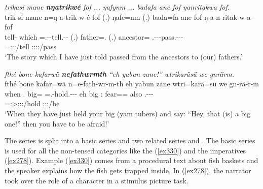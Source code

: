 \begin{exe}
	\ex \emph{trikasi mane \textbf{nŋatrikwé} fof ... ŋafynm ... badafa ane fof ŋanritakwa fof.}\\
	\glll trik-si mane n=ŋ-a-trik-w-é fof (.) ŋafe=nm (.) bada=fa ane fof ŋ-a-n-ritak-w-a-\Zero{} fof\\
	tell-\Nmlz{} which \Immpst=\M.\Alph-\Vc-tell.\Ext-\Ndu-\Fsg{} \Emph{} (.) father=\Dat.\Nsg{} (.) ancestor=\Abl{} \Dem{} \Emph{} \M.\Alph-\Vc-\Venit-pass.\Ext-\Ndu-\Pst-\Sg{} \Emph{}\\
	{} {} \footnotesize{\Immpst=\Fsg:\Sbj:\Nonpast:\Ipfv/tell} {} {} {} {} {} {} {} \footnotesize{\Stsg:\Sbj:\Pst:\Ipfv:\Venit/pass} {}\\
	\trans `The story which I have just told passed from the ancestors to (our) fathers.'\\
	\label{ex273}
\end{exe}
\begin{exe}
	\ex \emph{fthé bone kafarwä \textbf{nefathwrmth} ``eh yabun zane!'' wtrikaräsü we gnrärm.}\\
	\glll fthé bone kafar=wä n=e-fath-wr-m-th eh yabun zane wtri=karä=sü we gn-rä-r-m\\
	when \Ssg.\Poss{} big=\Emph{} \Immpst=\Stnsg.\Alph-hold.\Ext-\Ndu-\Dur-\Stnsg{} eh big \Dem:\Prox{} fear=\Prop=\Etc{} also \Ssg.\Bet-\Cop-\Ndu-\Dur{}\\
	{} {} {} \footnotesize{\Immpst=\Stpl:\Sbj>\Stpl:\Obj:\Nonpast:\Dur/hold} {} {} {} {} {} \footnotesize{\Ssg:\Sbj:\Futimp:\Ipfv/be}\\
	\trans `When they have just held your big (yam tubers) and say: ``Hey, that (is) a big one!'' then you have to be afraid!'
	\label{ex274}
\end{exe}

The \Bet{} series is split into a basic series \Bet{} and two related series \Betaone{} and \Betatwo. The basic \Bet{} series is used for all the non-tensed categories like the  (\ref{ex330}) and the imperatives (\ref{ex278}). Example (\ref{ex330}) comes from a procedural text about fish baskets and the speaker explains how the fish gets trapped inside. In (\ref{ex278}), the narrator took over the role of a character in a stimulus picture task.

